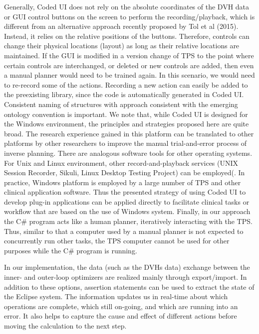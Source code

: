 Generally, Coded UI does not rely on the absolute coordinates of the DVH data or GUI control buttons on the screen to perform the recording/playback, which is different from an alternative approach recently proposed by Tol et al (2015). Instead, it relies on the relative positions of the buttons. Therefore, controls can change their physical locations (layout) as long as their relative locations are maintained. If the GUI is modified in a version change of TPS to the point where certain controls are interchanged, or deleted or new controls are added, then even a manual planner would need to be trained again. In this scenario, we would need to re-record some of the actions. Recording a new action can easily be added to the preexisting library, since the code is automatically generated in Coded UI. Consistent naming of structures with approach consistent with the emerging ontology convention is important. We note that, while Coded UI is designed for the Windows environment, the principles and strategies proposed here are quite broad. The research experience gained in this platform can be translated to other platforms by other researchers to improve the manual trial-and-error process of inverse planning. There are analogous software tools for other operating systems. For Unix and Linux environment, other record-and-playback services (UNIX Session Recorder, Sikuli, Linux Desktop Testing Project) can be employed(\cite{websiteb2015}. In practice, Windows platform is employed by a large number of TPS and other clinical application software. Thus the presented strategy of using Coded UI to develop plug-in applications can be applied directly to facilitate clinical tasks or workflow that are based on the use of Windows system. Finally, in our approach the C\# program acts like a human planner, iteratively interacting with the TPS. Thus, similar to that a computer used by a manual planner is not expected to concurrently run other tasks, the TPS computer cannot be used for other purposes while the C\# program is running.

In our implementation, the data (such as the DVHs data) exchange between the inner- and outer-loop optimizers are realized mainly through export/import. In addition to these options, assertion statements can be used to extract the state of the Eclipse system. The information updates us in real-time about which operations are complete, which still on-going, and which are running into an error. It also helps to capture the cause and effect of different actions before moving the calculation to the next step. 

